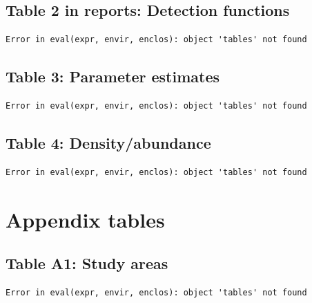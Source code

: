 \documentclass[
]{book}
\begin{document}
\hypertarget{table-2-in-reports-detection-functions}{%
\subsection*{Table 2 in reports: Detection functions}\label{table-2-in-reports-detection-functions}}

\begin{verbatim}
Error in eval(expr, envir, enclos): object 'tables' not found
\end{verbatim}

\hypertarget{table-3-parameter-estimates}{%
\subsection*{Table 3: Parameter estimates}\label{table-3-parameter-estimates}}

\begin{verbatim}
Error in eval(expr, envir, enclos): object 'tables' not found
\end{verbatim}

\hypertarget{table-4-densityabundance}{%
\subsection*{Table 4: Density/abundance}\label{table-4-densityabundance}}

\begin{verbatim}
Error in eval(expr, envir, enclos): object 'tables' not found
\end{verbatim}

\hypertarget{appendix-tables}{%
\section*{Appendix tables}\label{appendix-tables}}

\hypertarget{table-a1-study-areas}{%
\subsection*{Table A1: Study areas}\label{table-a1-study-areas}}

\begin{verbatim}
Error in eval(expr, envir, enclos): object 'tables' not found
\end{verbatim}
\end{document}
